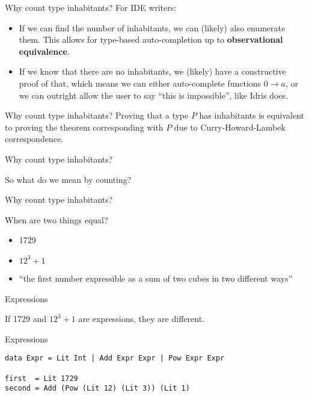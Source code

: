 \documentclass[tikz]{beamer}
\theoremstyle{definition}
\begin{document}
\begin{frame}{Why count type inhabitants?}
For IDE writers: 
\begin{itemize}
    \item If we can find the number of inhabitants, we can (likely) also enumerate them. This allows for type-based auto-completion up to \textbf{observational equivalence}.
    \item If we know that there are no inhabitants, we (likely) have a constructive proof of that, which means we can either auto-complete functions $0 \rightarrow a$, or we can outright allow the user to say ``this is impossible'', like Idris does.
\end{itemize}

\end{frame}

\begin{frame}{Why count type inhabitants?}
Proving that a type $P$ has inhabitants is equivalent to proving the theorem corresponding with $P$ due to Curry-Howard-Lambek correspondence.
\end{frame}

\begin{frame}{Why count type inhabitants?}

So what do we mean by counting?

\end{frame}

\begin{frame}{Why count type inhabitants?}

When are two things equal? 

\begin{itemize}
	\item 1729 
	\item $12^3 + 1$
	\item ``the first number expressible as a sum of two cubes in two different ways''
\end{itemize}

\end{frame}

\begin{frame}[fragile]{Expressions}

If 1729 and $12^3+1$ are expressions, they are different.

\end{frame}

\begin{frame}[fragile]{Expressions}

\begin{verbatim}
data Expr = Lit Int | Add Expr Expr | Pow Expr Expr

first  = Lit 1729
second = Add (Pow (Lit 12) (Lit 3)) (Lit 1)
\end{verbatim}
\end{frame}
\end{document}
